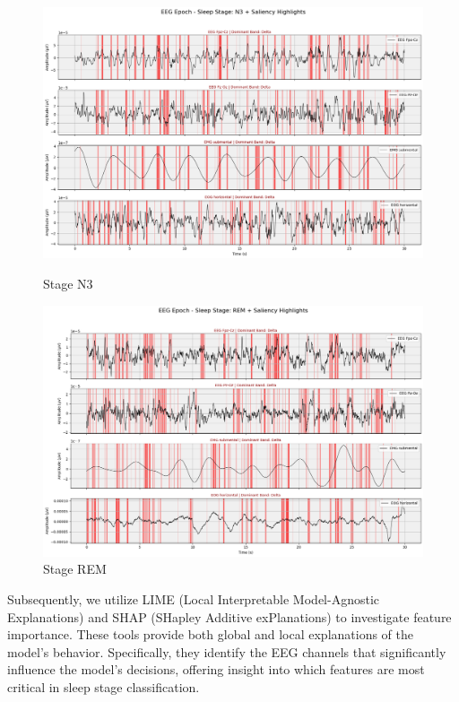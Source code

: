 \begin{figure}[htbp]
	\centering
	\begin{minipage}[b]{0.45\linewidth}
		\includegraphics[width=\linewidth]{"img/paper_3/stage n3"}
		\caption{Stage N3}
		\label{fig:stage-n3}
	\end{minipage}
	\hfill
	\begin{minipage}[b]{0.45\linewidth}
		\includegraphics[width=\linewidth]{"img/paper_3/stage rem"}
		\caption{Stage REM}
		\label{fig:stage-rem}
	\end{minipage}
\end{figure}



Subsequently, we utilize LIME (Local Interpretable Model-Agnostic Explanations) and SHAP (SHapley Additive exPlanations) to investigate feature importance. These tools provide both global and local explanations of the model's behavior. Specifically, they identify the EEG channels that significantly influence the model's decisions, offering insight into which features are most critical in sleep stage classification.




